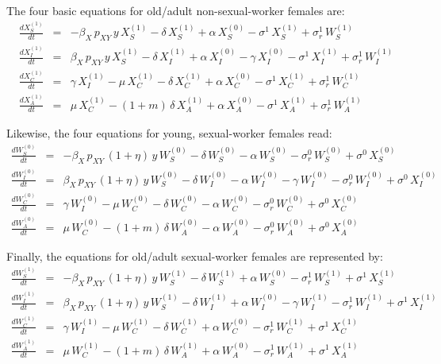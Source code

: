 \documentclass[preprint,12pt]{elsarticle}
\begin{document}
The four basic equations for old/adult non-sexual-worker females are:
\begin{eqnarray}
\frac{dX^{(1)}_S}{dt} & = & - \beta_X\,p_{XY}\,y\, X^{(1)}_S - \delta\,X^{(1)}_S + \alpha \, X^{(0)}_S -\sigma^1\,X^{(1)}_S + \sigma^1_r\,W^{(1)}_S\nonumber\\
\frac{dX^{(1)}_I}{dt} & = & \beta_X\,p_{XY}\,y\, X^{(1)}_S - \delta\,X^{(1)}_I + \alpha\,X^{(0)}_I - \gamma\,X^{(0)}_I -\sigma^1\,X^{(1)}_I + \sigma^1_r\,W^{(1)}_I\nonumber\\
\frac{dX^{(1)}_C}{dt} & = & \gamma\,X^{(1)}_I - \mu\, X^{(1)}_C  - \delta\,X^{(1)}_C + \alpha\,X^{(0)}_C - \sigma^1\,X^{(1)}_C + \sigma^1_r\,W^{(1)}_C\nonumber\\
\frac{dX^{(1)}_A}{dt} & = & \mu\, X^{(1)}_C - (1+m)\,\delta\, X^{(1)}_A + \alpha\,X^{(0)}_A - \sigma^1\,X^{(1)}_A + \sigma^1_r\,W^{(1)}_A
\label{eq:X_1}
\end{eqnarray}
\smallskip

Likewise, the four equations for young, sexual-worker females read:
\begin{eqnarray}
\frac{dW^{(0)}_S}{dt} & = & - \beta_X\,p_{XY}\,(1+\eta)\,y\, W^{(0)}_S - \delta\,W^{(0)}_S -\alpha \, W^{(0)}_S - \sigma^0_r\,W^{(0)}_S + \sigma^0\,X^{(0)}_S\nonumber\\
\frac{dW^{(0)}_I}{dt} & = & \beta_X\,p_{XY}\,(1+\eta)\,y\, W^{(0)}_S - \delta\,W^{(0)}_I -\alpha \, W^{(0)}_I -\gamma\,W^{(0)}_I -\sigma^0_r\,W^{(0)}_I + \sigma^0\,X^{(0)}_I\nonumber\\
\frac{dW^{(0)}_C}{dt} & = & \gamma\,W^{(0)}_I - \mu\, W^{(0)}_C  - \delta\,W^{(0)}_C - \alpha \, W^{(0)}_C - \sigma^0_r\,W^{(0)}_C + \sigma^0\,X^{(0)}_C\nonumber\\
\frac{dW^{(0)}_A}{dt} & = & \mu\, W^{(0)}_C - (1+m)\,\delta\, W^{(0)}_A -\alpha \,W^{(0)}_A - \sigma^0_r\,W^{(0)}_A + \sigma^0\,X^{(0)}_A
\label{eq:W_0}
\end{eqnarray}
\smallskip

Finally, the equations for old/adult sexual-worker females are represented by:
\begin{eqnarray}
\frac{dW^{(1)}_S}{dt} & = & - \beta_X\,p_{XY}\,(1+\eta)\,y\, W^{(1)}_S - \delta\,W^{(1)}_S + \alpha \, W^{(0)}_S-\sigma^1_r\,W^{(1)}_S + \sigma^1\,X^{(1)}_S\nonumber\\
\frac{dW^{(1)}_I}{dt} & = & \beta_X\,p_{XY}\,(1+\eta)\,y\, W^{(1)}_S - \delta\,W^{(1)}_I + \alpha \, W^{(0)}_I -\gamma\,W^{(1)}_I -\sigma^1_r\,W^{(1)}_I + \sigma^1\,X^{(1)}_I\nonumber\\
\frac{dW^{(1)}_C}{dt} & = & \gamma\,W^{(1)}_I - \mu\, W^{(1)}_C  - \delta\,W^{(1)}_C + \alpha \, W^{(0)}_C - \sigma^1_r\,W^{(1)}_C + \sigma^1\,X^{(1)}_C\nonumber\\
\frac{dW^{(1)}_A}{dt} & = & \mu\, W^{(1)}_C - (1+m)\,\delta\, W^{(1)}_A + \alpha \,W^{(0)}_A - \sigma^1_r\,W^{(1)}_A + \sigma^1\,X^{(1)}_A
\label{eq:W_1}
\end{eqnarray}
\smallskip
\end{document}
